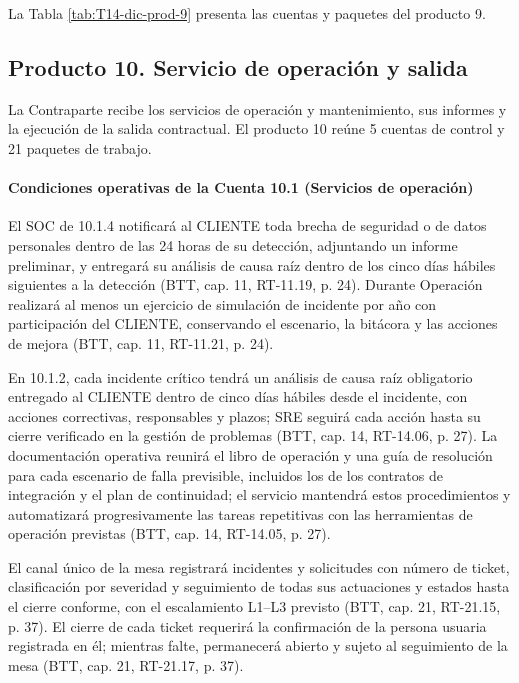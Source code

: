 La Tabla \ref{tab:T14-dic-prod-9} presenta las cuentas y paquetes del producto 9.

\subsection{Producto 10. Servicio de operación y salida}

La Contraparte recibe los servicios de operación y mantenimiento, sus informes y la ejecución de la salida contractual.
El producto 10 reúne 5 cuentas de control y 21 paquetes de trabajo.

\paragraph{Condiciones operativas de la Cuenta 10.1 (Servicios de operación)}
El SOC de 10.1.4 notificará al CLIENTE toda brecha de seguridad o de datos personales dentro de las 24 horas de su detección, adjuntando un informe preliminar, y entregará su análisis de causa raíz dentro de los cinco días hábiles siguientes a la detección (BTT, cap. 11, RT-11.19, p. 24). Durante Operación realizará al menos un ejercicio de simulación de incidente por año con participación del CLIENTE, conservando el escenario, la bitácora y las acciones de mejora (BTT, cap. 11, RT-11.21, p. 24).

En 10.1.2, cada incidente crítico tendrá un análisis de causa raíz obligatorio entregado al CLIENTE dentro de cinco días hábiles desde el incidente, con acciones correctivas, responsables y plazos; SRE seguirá cada acción hasta su cierre verificado en la gestión de problemas (BTT, cap. 14, RT-14.06, p. 27). La documentación operativa reunirá el libro de operación y una guía de resolución para cada escenario de falla previsible, incluidos los de los contratos de integración y el plan de continuidad; el servicio mantendrá estos procedimientos y automatizará progresivamente las tareas repetitivas con las herramientas de operación previstas (BTT, cap. 14, RT-14.05, p. 27).

El canal único de la mesa registrará incidentes y solicitudes con número de ticket, clasificación por severidad y seguimiento de todas sus actuaciones y estados hasta el cierre conforme, con el escalamiento L1–L3 previsto (BTT, cap. 21, RT-21.15, p. 37). El cierre de cada ticket requerirá la confirmación de la persona usuaria registrada en él; mientras falte, permanecerá abierto y sujeto al seguimiento de la mesa (BTT, cap. 21, RT-21.17, p. 37).

